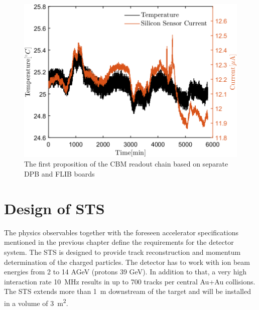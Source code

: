 \begin{figure}[!h]
\centering
\includegraphics[width=0.65\columnwidth]{Chapter2/images/currenttempnobeam.png}
\caption{The first proposition of the CBM readout chain based on separate DPB and FLIB boards \cite{CRI}}
\label{fig_leakage1}
\end{figure}




\section{Design of STS}


The physics observables together with the foreseen accelerator specifications mentioned in the previous chapter define the requirements for the detector system. The \gls{STS} is designed to provide track reconstruction and momentum determination of the charged particles. The detector has to work with ion beam energies from 2 to 14 AGeV (protons 39 GeV). In addition to that, a very high interaction rate 10~MHz results in up to 700 tracks per central Au+Au collisions. The \gls{STS} extends more than \SI{1}{\metre} downstream of the target and will be installed in a volume of \SI{3}{\square\metre}. 

